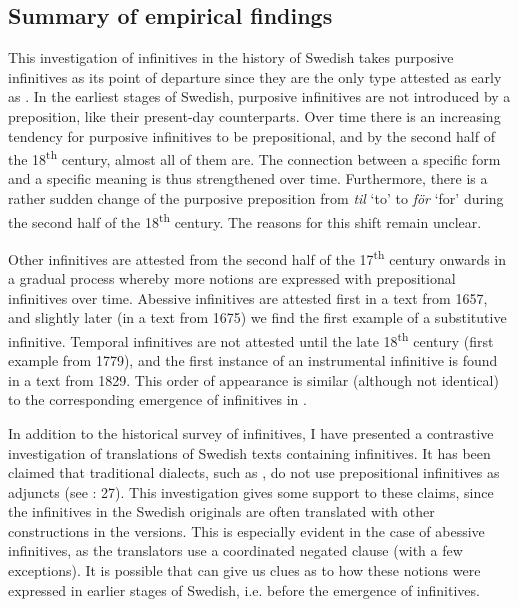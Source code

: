 \documentclass[output=paper]{langscibook}
\begin{document}
\subsection{Summary of empirical findings}\label{sec:kalm:4.4}


This investigation of  infinitives in the history of Swedish takes purposive infinitives as its point of departure since they are the only type attested as early as . In the earliest stages of Swedish, purposive infinitives are not introduced by a preposition, like their present-day counterparts. Over time there is an increasing tendency for purposive infinitives to be prepositional, and by the second half of the 18\textsuperscript{th} century, almost all of them are. The connection between a specific form and a specific meaning is thus strengthened over time. Furthermore, there is a rather sudden change of the purposive preposition from \textit{til} ‘to’ to \textit{för} ‘for’ during the second half of the 18\textsuperscript{th} century. The reasons for this shift remain unclear. 



Other  infinitives are attested from the second half of the 17\textsuperscript{th} century onwards in a gradual process whereby more  notions are expressed with prepositional infinitives over time. Abessive infinitives are attested first in a text from 1657, and slightly later (in a text from 1675) we find the first example of a substitutive infinitive. Temporal infinitives are not attested until the late 18\textsuperscript{th} century (first example from 1779), and the first instance of an instrumental infinitive is found in a text from 1829. This order of appearance is similar (although not identical) to the corresponding emergence of  infinitives in . 



In addition to the historical survey of  infinitives, I have presented a contrastive investigation of  translations of Swedish texts containing  infinitives. It has been claimed that traditional dialects, such as , do not use prepositional infinitives as  adjuncts (see \citealt{Holm1967}: 27). This investigation gives some support to these claims, since the  infinitives in the Swedish originals are often translated with other constructions in the  versions. This is especially evident in the case of abessive infinitives, as the translators use a coordinated negated clause (with a few exceptions). It is possible that  can give us clues as to how these  notions were expressed in earlier stages of Swedish, i.e. before the emergence of  infinitives. 
\end{document}
